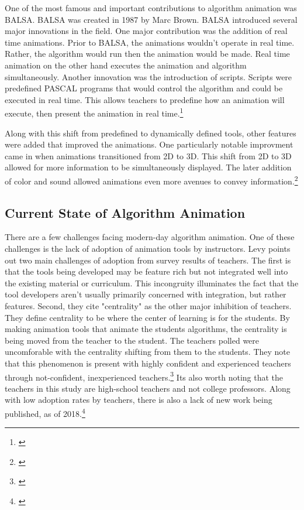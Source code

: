 \documentclass[12pt,twoside]{reedthesis}
\begin{document}
One of the most famous and important contributions to algorithm animation was BALSA. BALSA was created in 1987 by Marc Brown. BALSA introduced several major innovations in the field. One major contribution was the addition of real time animations. Prior to BALSA, the animations wouldn't operate in real time. Rather, the algorithm would run then the animation would be made. Real time animation on the other hand executes the animation and algorithm simultaneously. Another innovation was the introduction of scripts. Scripts were predefined PASCAL programs that would control the algorithm and could be executed in real time. This allows teachers to predefine how an animation will execute, then present the animation in real time.\footnote{\cite{brown_algorithm_1987}}

Along with this shift from predefined to dynamically defined tools, other features were added that improved the animations. One particularly notable improvment came in when animations transitioned from 2D to 3D. This shift from 2D to 3D allowed for more information to be simultaneously displayed. The later addition of color and sound allowed animations even more avenues to convey information.\footnote{\cite{najork_library_1994}}

\subsection{Current State of Algorithm Animation}
There are a few challenges facing modern-day algorithm animation. One of these challenges is the lack of adoption of animation tools by instructors. Levy points out two main challenges of adoption from survey results of teachers. The first is that the tools being developed may be feature rich but not integrated well into the existing material or curriculum. This incongruity illuminates the fact that the tool developers aren't usually primarily concerned with integration, but rather features. Second, they cite "centrality" as the other major inhibition of teachers. They define centrality to be 	where the center of learning is for the students. By making animation tools that animate the students algorithms, the centrality is being moved from the teacher to the student. The teachers polled were uncomforable with the centrality shifting from them to the students. They note that this phenomenon is present with highly confident and experienced teachers through not-confident, inexperienced teachers.\footnote{\cite{levy_we_2007}}  Its also worth noting that the teachers in this study are high-school teachers and not college professors. Along with low adoption rates by teachers, there is also a lack of new work being published, as of 2018.\footnote{\cite{kucera_visualization_2018}}  
\end{document}
